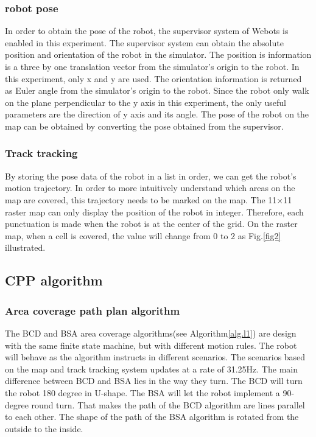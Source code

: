 \documentclass[conference]{IEEEtran}
\begin{document}
\subsubsection{robot pose}

In order to obtain the pose of the robot, the supervisor system of Webots is enabled in this experiment. The supervisor system can obtain the absolute position and orientation of the robot in the simulator. The position is information is a three by one translation vector from the simulator's origin to the robot. In this experiment, only x and y are used. The orientation information is returned as Euler angle from the simulator's origin to the robot. Since the robot only walk on the plane perpendicular to the y axis in this experiment, the only useful parameters are the direction of y axis and its angle. The pose of the robot on the map can be obtained by converting the pose obtained from the supervisor. 

\subsubsection{Track tracking}

By storing the pose data of the robot in a list in order, we can get the robot's motion trajectory. In order to more intuitively understand which areas on the map are covered, this trajectory needs to be marked on the map. The 11×11 raster map can only display the position of the robot in integer. Therefore, each punctuation is made when the robot is at the center of the grid. On the raster map, when a cell is covered, the value will change from 0 to 2 as Fig.\ref{fig2} illustrated.

\subsection{CPP algorithm}

\subsubsection{Area coverage path plan algorithm}

The BCD and BSA area coverage algorithms(see Algorithm\ref{alg.l1}) are design with the same finite state machine, but with different motion rules. The robot will behave as the algorithm instructs in different scenarios. The scenarios based on the map and track tracking system updates at a rate of 31.25Hz. The main difference between BCD and BSA lies in the way they turn. The BCD will turn the robot 180 degree in U-shape. The BSA will let the robot implement a 90-degree round turn. That makes the path of the BCD algorithm are lines parallel to each other. The shape of the path of the BSA algorithm is rotated from the outside to the inside. 
\end{document}
